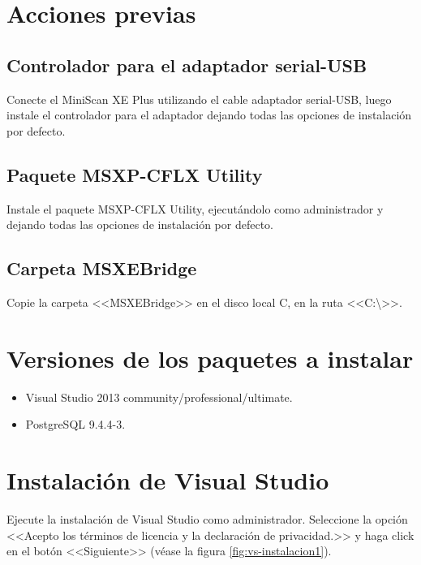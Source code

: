 \newpage

\section*{Acciones previas}

	\subsection*{Controlador para el adaptador serial-USB}
	
	Conecte el MiniScan XE Plus utilizando el cable adaptador serial-USB, luego instale el controlador para el adaptador dejando todas las opciones de instalaci\'{o}n por defecto.

	\subsection*{Paquete MSXP-CFLX Utility}
	
	Instale el paquete MSXP-CFLX Utility, ejecut\'{a}ndolo como administrador y dejando todas las opciones de instalaci\'{o}n por defecto.
	
	\subsection*{Carpeta MSXEBridge}
	
	Copie la carpeta <<MSXEBridge>> en el disco local C, en la ruta <<C:\textbackslash>>.
	
\section*{Versiones de los paquetes a instalar}

\begin{itemize}
	\item Visual Studio 2013 community/professional/ultimate.
	
	\item PostgreSQL 9.4.4-3.
\end{itemize}

\newpage

\section*{Instalaci\'{o}n de Visual Studio}
	
Ejecute la instalaci\'{o}n de Visual Studio como administrador. Seleccione la opci\'{o}n <<Acepto los t\'{e}rminos de licencia y la declaraci\'{o}n de privacidad.>> y haga click en el bot\'{o}n <<Siguiente>> (v\'{e}ase la figura \ref{fig:vs-instalacion1}).

